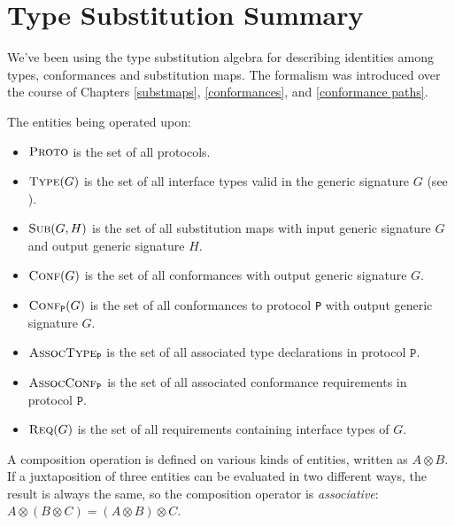 \documentclass[../generics]{subfiles}
\begin{document}
\chapter{Type Substitution Summary}\label{notation summary}

We've been using the type substitution algebra for describing identities among types, conformances and substitution maps. The formalism was introduced over the course of Chapters \ref{substmaps}, \ref{conformances}, and \ref{conformance paths}.

The entities being operated upon:
\begin{itemize}
\item {}$\textsc{Proto}$ is the set of all protocols.
\item {}$\textsc{Type}({G})$ is the set of all interface types valid in the generic signature $G$ (see ).
\item {}$\textsc{Sub}({G, H})$ is the set of all substitution maps with input generic signature $G$ and output generic signature $H$.
\item {}$\textsc{Conf}({G})$ is the set of all conformances with output generic signature $G$.
\item {}$\textsc{Conf}_{\texttt{P}}({G})$ is the set of all conformances to protocol \texttt{P} with output generic signature $G$.
\item {}$\textsc{AssocType}_{\texttt{P}}$ is the set of all associated type declarations in protocol $\texttt{P}$.
\item {}$\textsc{AssocConf}_{\texttt{P}}$ is the set of all associated conformance requirements in protocol $\texttt{P}$.
\item {}$\textsc{Req}({G})$ is the set of all requirements containing interface types of $G$.
\end{itemize}
A composition operation is defined on various kinds of entities, written as \index{$\otimes$}$A \otimes B$. If a juxtaposition of three entities can be evaluated in two different ways, the result is always the same, so the composition operator is \emph{associative}: $A\otimes (B\otimes C) = (A\otimes B) \otimes C$.
\end{document}
